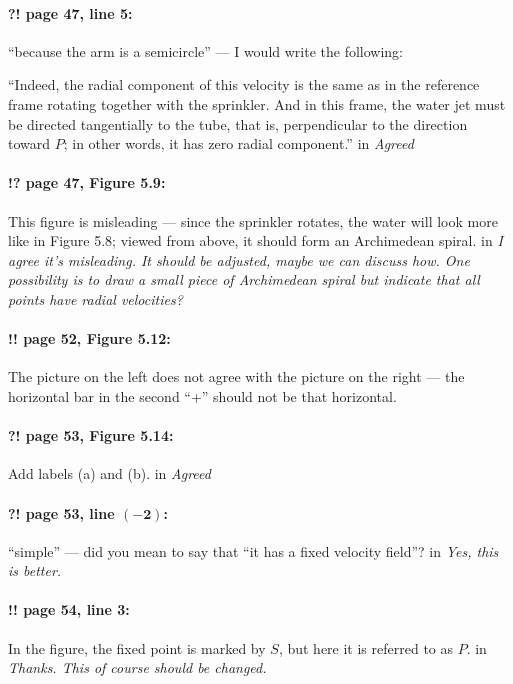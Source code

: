 \documentclass[twoside]{article}
\begin{document}
\paragraph{?! page 47, line 5:} “because the arm is a semicircle” — I would write the following:

“Indeed, the radial component of this velocity is the same as in the reference frame rotating together with the sprinkler.
And in this frame, the water jet must be directed tangentially to the tube, that is, perpendicular to the direction toward $P$; in other words, it has zero radial component.”
 in {\it  Agreed} 

\paragraph{!? page 47, Figure 5.9:} This figure is misleading — since the sprinkler rotates, the water will look more like in Figure 5.8; viewed from above, it should form an Archimedean spiral.
 in {\it  I agree it's misleading. It should be adjusted, maybe we can discuss how. One possibility is to draw a small piece of Archimedean spiral but indicate that all points have radial velocities?} 


\paragraph{!! page 52, Figure 5.12:} The picture on the left does not agree with the picture on the right — the horizontal bar in the second “+” should not be that horizontal.

\paragraph{?! page 53, Figure 5.14:} Add labels (a) and (b).
 in {\it  Agreed} 

\paragraph{?! page 53, line $\bm{(-2)}$:} “simple” — did you mean to say that “it has a fixed velocity field”?
 in {\it  Yes,  this is better.} 

\paragraph{!! page 54, line 3:} In the figure, the fixed point is marked by $S$, but here it is referred to as $P$.
 in {\it  Thanks. This of course should be changed.} 
\end{document}

